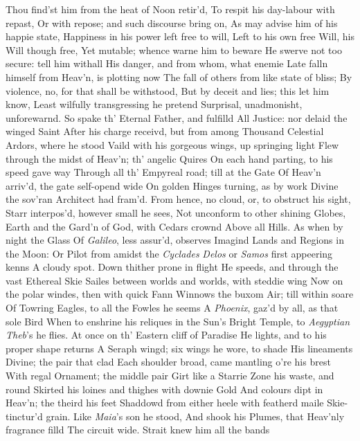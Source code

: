 \documentclass[11pt]{book}
\newcounter {first}
\begin{document}
Thou find'st him from the heat of Noon retir'd, 
To respit his day-labour with repast, 
Or with repose; and such discourse bring on, 
As may advise him of his happie state, 
Happiness in his power left free to will, 
Left to his own free Will, his Will though free, 
Yet mutable; whence warne him to beware 
He swerve not too secure: tell him withall 
His danger, and from whom, what enemie 
Late falln himself from Heav'n, is plotting now 
The fall of others from like state of bliss; 
By violence, no, for that shall be withstood, 
But by deceit and lies; this let him know, 
Least wilfully transgressing he pretend 
Surprisal, unadmonisht, unforewarnd. 
\quad So spake th' Eternal Father, and fulfilld 
All Justice: nor delaid the winged Saint 
After his charge receivd, but from among 
Thousand Celestial Ardors, where he stood 
Vaild with his gorgeous wings, up springing light 
Flew through the midst of Heav'n; th' angelic Quires 
On each hand parting, to his speed gave way 
Through all th' Empyreal road; till at the Gate 
Of Heav'n arriv'd, the gate self-opend wide 
On golden Hinges turning, as by work 
Divine the sov'ran Architect had fram'd. 
From hence, no cloud, or, to obstruct his sight, 
Starr interpos'd, however small he sees, 
Not unconform to other shining Globes, 
Earth and the Gard'n of God, with Cedars crownd 
Above all Hills.  As when by night the Glass 
Of \textit{Galileo}, less assur'd, observes 
Imagind Lands and Regions in the Moon: 
Or Pilot from amidst the \textit{Cyclades} 
\textit{Delos} or \textit{Samos} first appeering kenns 
A cloudy spot.  Down thither prone in flight 
He speeds, and through the vast Ethereal Skie 
Sailes between worlds and worlds, with steddie wing 
Now on the polar windes, then with quick Fann 
Winnows the buxom Air; till within soare 
Of Towring Eagles, to all the Fowles he seems 
A \textit{Phoenix}, gaz'd by all, as that sole Bird 
When to enshrine his reliques in the Sun's 
Bright Temple, to \textit{Aegyptian} \textit{Theb}'s he flies. 
At once on th' Eastern cliff of Paradise 
He lights, and to his proper shape returns 
A Seraph wingd; six wings he wore, to shade 
His lineaments Divine; the pair that clad 
Each shoulder broad, came mantling o're his brest 
With regal Ornament; the middle pair 
Girt like a Starrie Zone his waste, and round 
Skirted his loines and thighes with downie Gold 
And colours dipt in Heav'n; the theird his feet 
Shaddowd from either heele with featherd maile 
Skie-tinctur'd grain.  Like \textit{Maia}'s son he stood, 
And shook his Plumes, that Heav'nly fragrance filld 
The circuit wide.  Strait knew him all the bands 
\end{document}
